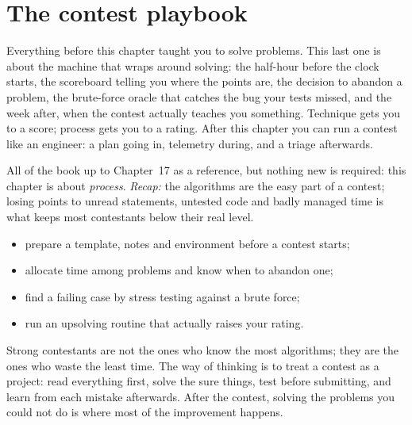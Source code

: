 \chapter{The contest playbook}\label{ch:playbook}

Everything before this chapter taught you to solve problems.
This last one is about the machine that wraps around solving:
the half-hour before the clock starts, the scoreboard telling
you where the points are, the decision to abandon a problem,
the brute-force oracle that catches the bug your tests missed,
and the week after, when the contest actually teaches you
something. Technique gets you to a score; process gets you to a
rating. After this chapter you can run a contest like an
engineer: a plan going in, telemetry during, and a triage
afterwards.

\begin{rulebox}
All of the book up to Chapter~17 as a reference, but nothing new is required: this chapter is about \emph{process}. \emph{Recap:} the algorithms are the easy part of a contest; losing points to unread statements, untested code and badly managed time is what keeps most contestants below their real level.
\end{rulebox}
\begin{wins}
\begin{itemize}
\item prepare a template, notes and environment before a contest starts;
\item allocate time among problems and know when to abandon one;
\item find a failing case by stress testing against a brute force;
\item run an upsolving routine that actually raises your rating.
\end{itemize}
\end{wins}
\begin{principle}
Strong contestants are not the ones who know the most algorithms; they are the ones who waste the least time. The way of thinking is to treat a contest as a project: read everything first, solve the sure things, test before submitting, and learn from each mistake afterwards. After the contest, solving the problems you could not do is where most of the improvement happens.
\end{principle}

